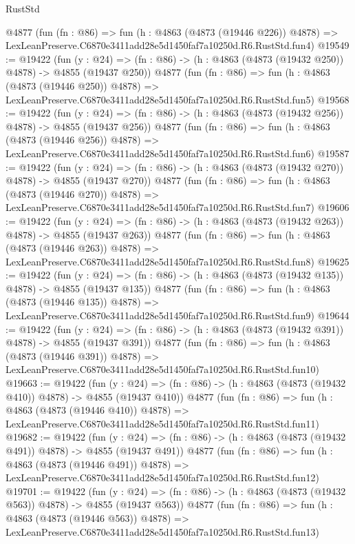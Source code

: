 \begin{lexlean}{RustStd}
\begin{coremodule}
    @4877
    (fun (fn : @86) =>
    fun (h : @4863 (@4873 (@19446 @226)) @4878) =>
    LexLeanPreserve.C6870e3411add28e5d1450faf7a10250d.R6.RustStd.fun4)
@19549 := @19422
    (fun (y : @24) => (fn : @86) -> (h : @4863 (@4873 (@19432 @250)) @4878) -> @4855 (@19437 @250))
    @4877
    (fun (fn : @86) =>
    fun (h : @4863 (@4873 (@19446 @250)) @4878) =>
    LexLeanPreserve.C6870e3411add28e5d1450faf7a10250d.R6.RustStd.fun5)
@19568 := @19422
    (fun (y : @24) => (fn : @86) -> (h : @4863 (@4873 (@19432 @256)) @4878) -> @4855 (@19437 @256))
    @4877
    (fun (fn : @86) =>
    fun (h : @4863 (@4873 (@19446 @256)) @4878) =>
    LexLeanPreserve.C6870e3411add28e5d1450faf7a10250d.R6.RustStd.fun6)
@19587 := @19422
    (fun (y : @24) => (fn : @86) -> (h : @4863 (@4873 (@19432 @270)) @4878) -> @4855 (@19437 @270))
    @4877
    (fun (fn : @86) =>
    fun (h : @4863 (@4873 (@19446 @270)) @4878) =>
    LexLeanPreserve.C6870e3411add28e5d1450faf7a10250d.R6.RustStd.fun7)
@19606 := @19422
    (fun (y : @24) => (fn : @86) -> (h : @4863 (@4873 (@19432 @263)) @4878) -> @4855 (@19437 @263))
    @4877
    (fun (fn : @86) =>
    fun (h : @4863 (@4873 (@19446 @263)) @4878) =>
    LexLeanPreserve.C6870e3411add28e5d1450faf7a10250d.R6.RustStd.fun8)
@19625 := @19422
    (fun (y : @24) => (fn : @86) -> (h : @4863 (@4873 (@19432 @135)) @4878) -> @4855 (@19437 @135))
    @4877
    (fun (fn : @86) =>
    fun (h : @4863 (@4873 (@19446 @135)) @4878) =>
    LexLeanPreserve.C6870e3411add28e5d1450faf7a10250d.R6.RustStd.fun9)
@19644 := @19422
    (fun (y : @24) => (fn : @86) -> (h : @4863 (@4873 (@19432 @391)) @4878) -> @4855 (@19437 @391))
    @4877
    (fun (fn : @86) =>
    fun (h : @4863 (@4873 (@19446 @391)) @4878) =>
    LexLeanPreserve.C6870e3411add28e5d1450faf7a10250d.R6.RustStd.fun10)
@19663 := @19422
    (fun (y : @24) => (fn : @86) -> (h : @4863 (@4873 (@19432 @410)) @4878) -> @4855 (@19437 @410))
    @4877
    (fun (fn : @86) =>
    fun (h : @4863 (@4873 (@19446 @410)) @4878) =>
    LexLeanPreserve.C6870e3411add28e5d1450faf7a10250d.R6.RustStd.fun11)
@19682 := @19422
    (fun (y : @24) => (fn : @86) -> (h : @4863 (@4873 (@19432 @491)) @4878) -> @4855 (@19437 @491))
    @4877
    (fun (fn : @86) =>
    fun (h : @4863 (@4873 (@19446 @491)) @4878) =>
    LexLeanPreserve.C6870e3411add28e5d1450faf7a10250d.R6.RustStd.fun12)
@19701 := @19422
    (fun (y : @24) => (fn : @86) -> (h : @4863 (@4873 (@19432 @563)) @4878) -> @4855 (@19437 @563))
    @4877
    (fun (fn : @86) =>
    fun (h : @4863 (@4873 (@19446 @563)) @4878) =>
    LexLeanPreserve.C6870e3411add28e5d1450faf7a10250d.R6.RustStd.fun13)

\end{coremodule}
\end{lexlean}
